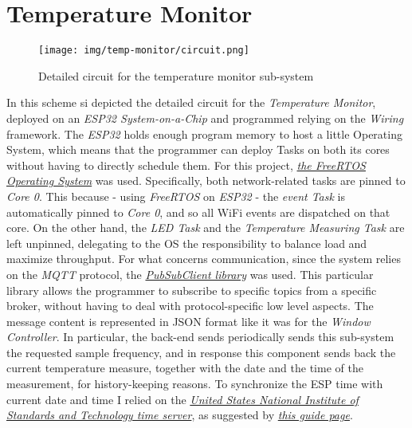 \documentclass[a4paper,12pt]{report}
\begin{document}
	\section{Temperature Monitor}
	\begin{figure}[H]
		\centering{}
		\texttt{[image: img/temp-monitor/circuit.png]}
		\caption{Detailed circuit for the temperature monitor sub-system}
		\label{img:temp-monitor/circuit}
	\end{figure}
	In this scheme si depicted the detailed circuit for the \textit{Temperature Monitor}, deployed on an \textit{ESP32 System-on-a-Chip} and programmed relying on the \textit{Wiring} framework.
	\newline The \textit{ESP32} holds enough program memory to host a little Operating System, which means that the programmer can deploy Tasks on both its cores without having to directly schedule them. For this project, \href{https://www.freertos.org/}{\textit{the FreeRTOS Operating System}} was used.
	\newline Specifically, both network-related tasks are pinned to \textit{Core 0}. This because - using \textit{FreeRTOS} on \textit{ESP32} - the \textit{event Task} is automatically pinned to \textit{Core 0}, and so all WiFi events are dispatched on that core. On the other hand, the \textit{LED Task} and the \textit{Temperature Measuring Task} are left unpinned, delegating to the OS the responsibility to balance load and maximize throughput.
	\newline For what concerns communication, since the system relies on the \textit{MQTT} protocol, the \href{https://pubsubclient.knolleary.net/}{\textit{PubSubClient library}} was used. This particular library allows the programmer to subscribe to specific topics from a specific broker, without having to deal with protocol-specific low level aspects. The message content is represented in JSON format like it was for the \textit{Window Controller}. In particular, the back-end sends periodically sends this sub-system the requested sample frequency, and in response this component sends back the current temperature measure, together with the date and the time of the measurement, for history-keeping reasons.
	\newline To synchronize the ESP time with current date and time I relied on the \href{https://www.nist.gov/}{\textit{United States National Institute of Standards and Technology time server}}, as suggested by \href{https://www.programmingelectronics.com/esp32-time-servers/}{\textit{this guide page}}.
\end{document}

